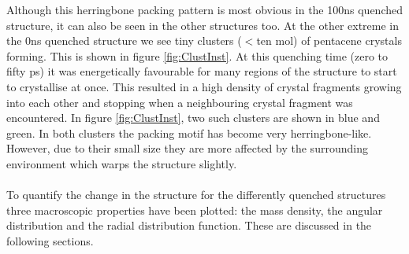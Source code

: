 \vspace{0.3cm}
Although this herringbone packing pattern is most obvious in the 100ns quenched structure, it can also be seen in the other structures too. At the other extreme in the 0ns quenched structure we see tiny clusters ($<$ten mol) of pentacene crystals forming. This is shown in figure \ref{fig:ClustInst}. At this quenching time (zero to fifty ps) it was energetically favourable for many regions of the structure to start to crystallise at once. This resulted in a high density of crystal fragments growing into each other and stopping when a neighbouring crystal fragment was encountered. In figure \ref{fig:ClustInst}, two such clusters are shown in blue and green. In both clusters the packing motif has become very herringbone-like. However, due to their small size they are more affected by the surrounding environment which warps the structure slightly. 
\\\\
\noindent To quantify the change in the structure for the differently quenched structures three macroscopic properties have been plotted: the mass density, the angular distribution and the radial distribution function. These are discussed in the following sections.
